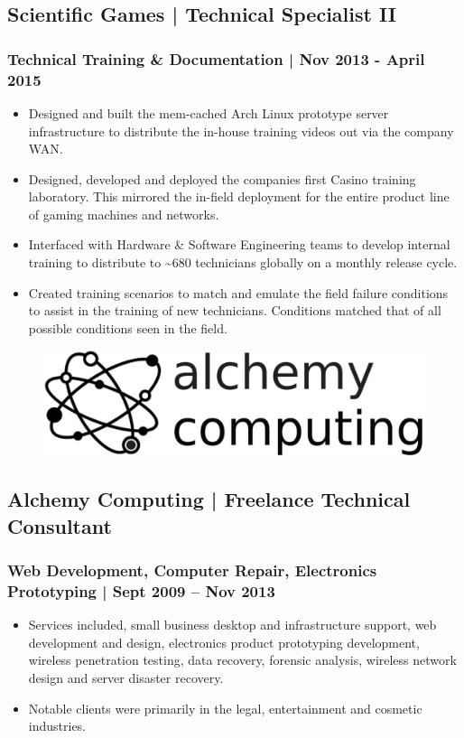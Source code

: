 \documentclass[letter,10pt]{article}
\begin{document}
\subsection*{Scientific Games | Technical Specialist II}
\label{sec:org260dbc7}
\subsubsection*{Technical Training \& Documentation | Nov 2013 - April 2015}
\label{sec:org88e7345}
\begin{itemize}
\item Designed and built the mem-cached Arch Linux prototype server infrastructure to distribute the in-house training videos out via the company WAN.
\item Designed, developed and deployed the companies first Casino training laboratory. This mirrored the in-field deployment for the entire product line of gaming machines and networks.
\item Interfaced with Hardware \& Software Engineering teams to develop internal training to distribute to \textasciitilde{}680 technicians globally on a monthly release cycle.
\item Created training scenarios to match and emulate the field failure conditions to assist in the training of new technicians. Conditions matched that of all possible conditions seen in the field.
\end{itemize}



\begin{figure}
\includegraphics[width=0.8\linewidth]{./img/50p_alchemy_computing.jpg}
\end{figure}

\subsection*{Alchemy Computing | Freelance Technical Consultant}
\label{sec:org06d60bc}
\subsubsection*{Web Development, Computer Repair, Electronics Prototyping | Sept 2009 – Nov 2013}
\label{sec:org471c37f}
\begin{itemize}
\item Services included, small business desktop and infrastructure support, web development and design, electronics product prototyping development, wireless penetration testing, data recovery, forensic analysis, wireless network design and server disaster recovery.
\item Notable clients were primarily in the legal, entertainment and cosmetic industries.
\end{itemize}
\end{document}

